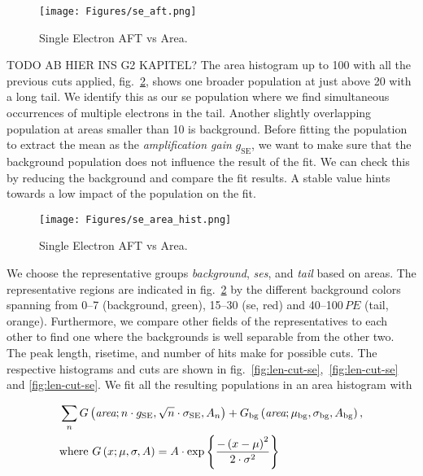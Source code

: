 \begin{figure}
    \centering
    \texttt{[image: Figures/se\_aft.png]}  %
    \caption[AFT vs Area Single Electrons]{
        Single Electron AFT vs Area.
    }
    \label{fig:se-aft}
\end{figure}

TODO AB HIER INS G2 KAPITEL?
The area histogram up to \SI{100}{} with all the previous cuts applied, fig.~\ref{fig:se-area-hist}, shows one broader population at just above \SI{20}{} with a long tail.
We identify this as our \gls{se} population where we find simultaneous occurrences of multiple electrons in the tail.
Another slightly overlapping population at areas smaller than \SI{10}{} is background.
Before fitting the population to extract the mean as the \emph{amplification gain} $ g_\mathrm{SE} $, we want to make sure that the background population does not influence the result of the fit.
We can check this by reducing the background and compare the fit results.
A stable value hints towards a low impact of the population on the fit.

\begin{figure}
    \centering
    \texttt{[image: Figures/se\_area\_hist.png]}  %
    \caption[Histogram Area Single Electrons and Background]{
        Single Electron AFT vs Area.
    }
    \label{fig:se-area-hist}
\end{figure}


We choose the representative groups \emph{background}, \emph{\glspl{se}}, and \emph{tail} based on areas.
The representative regions are indicated in fig.~\ref{fig:se-area-hist} by the different background colors spanning from \numrange{0}{7} (background, green), \numrange{15}{30} (\gls{se}, red) and \numrange{40}{100}$ \,\mathit{PE} $ (tail, orange).
Furthermore, we compare other fields of the representatives to each other to find one where the backgrounds is well separable from the other two.
The peak length, risetime, and number of hits make for possible cuts.
The respective histograms and cuts are shown in fig.~\ref{fig:len-cut-se},~\ref{fig:len-cut-se} and \ref{fig:len-cut-se}.
We fit all the resulting populations in an area histogram with %


\begin{align}
    &\sum_{n} G \left(  \textit{area}; n \cdot g_\mathrm{SE}, \sqrt{n} \cdot \sigma_\mathrm{SE}, A_n \right) +
    G_\mathrm{bg} \left( \textit{area};  \mu_\mathrm{bg}, \sigma_\mathrm{bg}, A_\mathrm{bg} \right), \\
    &\mathrm{where~} G \left( x;  \mu, \sigma, A \right) = A \cdot \exp{ \left\{ \frac{-\left( x - \mu \right)^2}{2\cdot\sigma^2} \right\} }
    \label{eq:se-fit-model}
\end{align}


